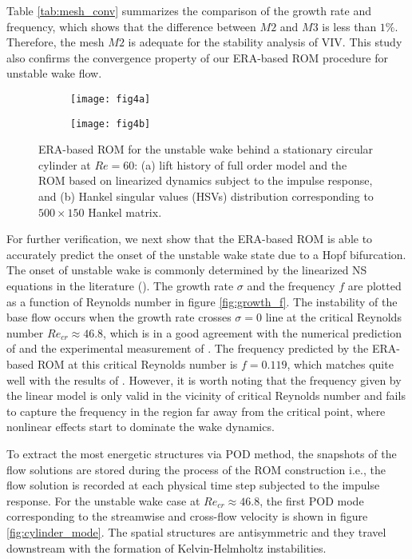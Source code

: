 \documentclass{jfm}
\begin{document}
Table \ref{tab:mesh_conv} summarizes the comparison of the growth rate and frequency, 
which shows that the difference between $M2$ and $M3$ is less than $1\%$. 
Therefore, the mesh $M2$ is adequate for the stability analysis of VIV.
This study also confirms the convergence property of our ERA-based ROM procedure 
for unstable wake flow. 
\begin{figure}
\centering 
\begin{subfigure}{0.495\textwidth}
\centering
  \texttt{[image: fig4a]}
    \caption{}
    \label{fig:signal}
    \end{subfigure} 
\begin{subfigure}{0.495\textwidth}
\centering
  \texttt{[image: fig4b]}
    \caption{}
    \label{fig:HVS}
    \end{subfigure} 
  \caption{ERA-based ROM for the unstable wake behind a stationary circular 
  cylinder at $Re=60$: (a) lift history of full order model and the ROM based on
  linearized dynamics subject to the impulse response, and 
  (b) Hankel singular values (HSVs) distribution corresponding to $500 \times 150$ Hankel matrix.}

\end{figure}
For further verification, we next show that the ERA-based ROM 
is able to accurately predict the onset of the unstable wake state due to a
Hopf bifurcation.
The onset of unstable wake is commonly determined by the linearized 
NS equations in the literature (\cite{Luchini2007,Marquet2008,Mettot2014}). 
The growth rate $\sigma$ and 
the frequency $f$ are plotted as a function of Reynolds number in figure \ref{fig:growth_f}. 
The instability of the base flow occurs when the growth rate crosses $\sigma=0$
line at the critical Reynolds number $Re_{cr} \approx 46.8$, which is in a good agreement 
with the numerical prediction of \cite{Luchini2007,Marquet2008} and the experimental 
measurement of \cite{Williamson1996}. 
%
The frequency predicted by the ERA-based ROM at this critical Reynolds number 
is $f=0.119$, which matches quite well with the results 
of \cite{Luchini2007,Marquet2008}. However, it is worth noting that 
the frequency given by the linear model is only valid in the vicinity of critical Reynolds 
number and fails to capture the frequency in the region far away from the critical point, 
where nonlinear effects start to dominate the wake dynamics. 

To extract the most energetic structures via POD method, the snapshots of the flow 
solutions are stored during the process of the ROM construction i.e., the flow solution
is recorded at each physical time step subjected to the impulse response. 
For the unstable wake case at $Re_{cr} \approx 46.8$, 
the first POD mode corresponding to the 
streamwise and cross-flow velocity is shown 
in figure \ref{fig:cylinder_mode}. The spatial structures are antisymmetric and 
they travel downstream with the formation of Kelvin-Helmholtz instabilities.
\end{document}
